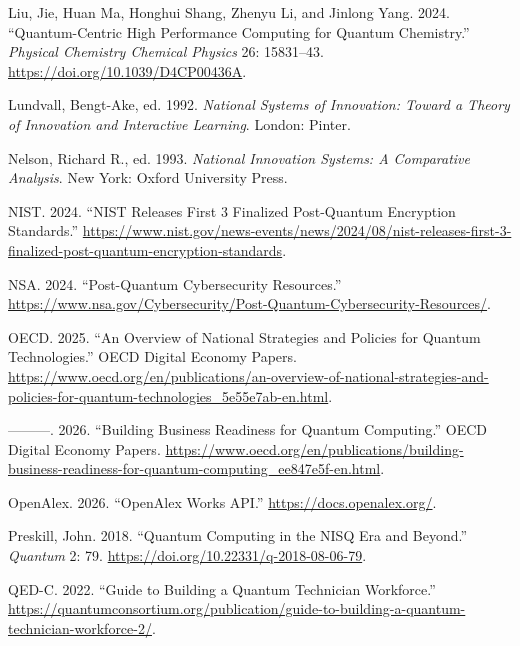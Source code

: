 \documentclass[
  11pt,
  letterpaper,
]{article}
\newlength{\cslhangindent}
\newenvironment{CSLReferences}[2] %
 {\begin{list}{}{%
  \setlength{\itemindent}{0pt}
  \setlength{\leftmargin}{0pt}
  \setlength{\parsep}{0pt}
  \ifodd #1
   \setlength{\leftmargin}{\cslhangindent}
   \setlength{\itemindent}{-1\cslhangindent}
  \fi
  \setlength{\itemsep}{#2\baselineskip}}}
 {\end{list}}
\begin{document}
\begin{CSLReferences}{1}{0}
Liu, Jie, Huan Ma, Honghui Shang, Zhenyu Li, and Jinlong Yang. 2024.
{``Quantum-Centric High Performance Computing for Quantum Chemistry.''}
\emph{Physical Chemistry Chemical Physics} 26: 15831--43.
\url{https://doi.org/10.1039/D4CP00436A}.

Lundvall, Bengt-Ake, ed. 1992. \emph{National Systems of Innovation:
Toward a Theory of Innovation and Interactive Learning}. London: Pinter.

Nelson, Richard R., ed. 1993. \emph{National Innovation Systems: A
Comparative Analysis}. New York: Oxford University Press.

NIST. 2024. {``NIST Releases First 3 Finalized Post-Quantum Encryption
Standards.''}
\url{https://www.nist.gov/news-events/news/2024/08/nist-releases-first-3-finalized-post-quantum-encryption-standards}.

NSA. 2024. {``Post-Quantum Cybersecurity Resources.''}
\url{https://www.nsa.gov/Cybersecurity/Post-Quantum-Cybersecurity-Resources/}.

OECD. 2025. {``An Overview of National Strategies and Policies for
Quantum Technologies.''} OECD Digital Economy Papers.
\url{https://www.oecd.org/en/publications/an-overview-of-national-strategies-and-policies-for-quantum-technologies_5e55e7ab-en.html}.

---------. 2026. {``Building Business Readiness for Quantum
Computing.''} OECD Digital Economy Papers.
\url{https://www.oecd.org/en/publications/building-business-readiness-for-quantum-computing_ee847e5f-en.html}.

OpenAlex. 2026. {``OpenAlex Works API.''}
\url{https://docs.openalex.org/}.

Preskill, John. 2018. {``Quantum Computing in the NISQ Era and
Beyond.''} \emph{Quantum} 2: 79.
\url{https://doi.org/10.22331/q-2018-08-06-79}.

QED-C. 2022. {``Guide to Building a Quantum Technician Workforce.''}
\url{https://quantumconsortium.org/publication/guide-to-building-a-quantum-technician-workforce-2/}.

\end{CSLReferences}
\end{document}

